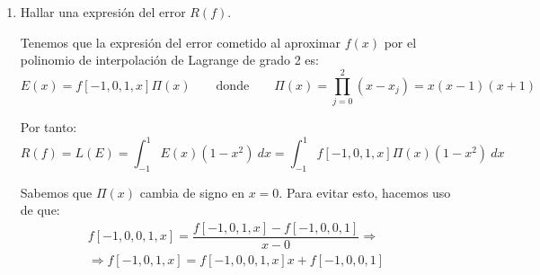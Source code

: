 \documentclass[12pt]{article}
\begin{document}
{\begin{ejercicio}
\begin{enumerate}
            Calculamos ahora los valores de $\alpha_0$, $\alpha_1$ y $\alpha_2$:
            \begin{align*}
                \alpha_0 &= \int_{-1}^1\ell_0(x)(1-x^2)\ dx = -\frac{1}{2}\int_{-1}^1(x^4-x^3-x^2+x)\ dx = -\left(\dfrac{1}{5}-\dfrac{1}{3}\right) = \dfrac{2}{15}\\
                \alpha_1 &= \int_{-1}^1\ell_1(x)(1-x^2)\ dx = \int_{-1}^1(x^4-2x^2+1)\ dx = 2\left(\dfrac{1}{5}-\dfrac{2}{3}+1\right) = \dfrac{16}{15}\\
                \alpha_2 &= \int_{-1}^1\ell_2(x)(1-x^2)\ dx = -\frac{1}{2}\int_{-1}^1(x^4+x^3-x^2-x)\ dx = \dfrac{2}{15}
            \end{align*}

            Por tanto, tenemos que:
            \begin{align*}
                \int_{-1}^1f(x)(1-x^2)\ dx &\approx \int_{-1}^1\left[\ell_0(x)f(-1)+\ell_1(x)f(0)+\ell_2(x)f(1)\right](1-x^2)\ dx\\
                &= \left(\int_{-1}^1\ell_0(x)(1-x^2)\ dx\right)f(-1)+\left(\int_{-1}^1\ell_1(x)(1-x^2)\ dx\right)f(0)+\\&\hspace{1.5cm}+\left(\int_{-1}^1\ell_2(x)(1-x^2)\ dx\right)f(1)\\
                &= \dfrac{2}{15}f(-1)+\dfrac{16}{15}f(0)+\dfrac{2}{15}f(1)
            \end{align*}
            \item Hallar una expresión del error $R(f)$.
            
            Tenemos que la expresión del error cometido al aproximar $f(x)$ por el polinomio de interpolación de Lagrange de grado 2 es:
            \begin{equation*}
                E(x) = f[-1,0,1,x]\Pi(x)\qquad \text{donde}\qquad \Pi(x) = \prod_{j=0}^2(x-x_j)=x(x-1)(x+1)
            \end{equation*}

            Por tanto:
            \begin{equation*}
                R(f)=L(E)=\int_{-1}^1E(x)(1-x^2)\ dx = \int_{-1}^1f[-1,0,1,x]\Pi(x)(1-x^2)\ dx
            \end{equation*}

            Sabemos que $\Pi(x)$ cambia de signo en $x=0$. Para evitar esto, hacemos uso de que:
            \begin{multline*}
                f[-1, 0, 0, 1, x] = \dfrac{f[-1, 0, 1, x]-f[-1, 0, 0, 1]}{x-0}
                \Longrightarrow\\\Longrightarrow f[-1, 0, 1, x] = f[-1, 0, 0, 1, x]x + f[-1, 0, 0, 1]
            \end{multline*}


\end{enumerate}
\end{ejercicio}}
\end{document}
